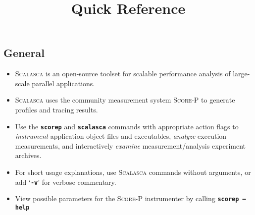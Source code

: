 \documentclass[a4paper]{article}
\title{\Scalasca \Version Quick Reference}
\newcommand{\Scalasca}{\textsc{Scalasca}\xspace}
\newcommand{\Scorep}{\textsc{Score-P}\xspace}
\begin{document}

\subsection*{General}

\begin{itemize}
  \item \Scalasca is an open-source toolset for scalable performance analysis of
        large-scale parallel applications.
  \item \Scalasca uses the community measurement system \Scorep to generate profiles and 
        tracing results.
  \item Use the \textbf{\texttt{scorep}}  and \textbf{\texttt{scalasca}} commands with 
        appropriate action flags to
        \textit{instrument\/} application object files and executables,
        \textit{analyze\/} execution measurements, and interactively
        \textit{examine\/} measurement/analysis experiment archives.
  \item For short usage explanations, use \Scalasca commands without arguments,
        or add `\textbf{\texttt{-v}}' for verbose commentary.
  \item View possible parameters for the \Scorep instrumenter by calling 
        \textbf{\texttt{scorep --help}}
\end{itemize}

\end{document}
